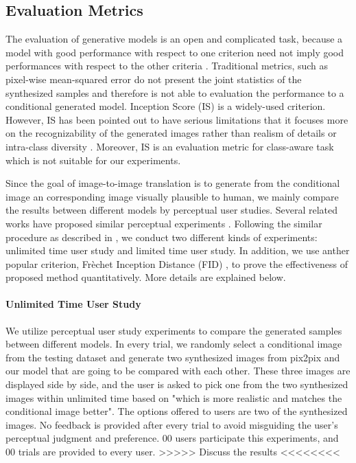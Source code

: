 \subsection{ Evaluation Metrics}
The evaluation of generative models is an open and complicated task, because a model with good performance with respect to one criterion need not imply good performances with respect to the other criteria \cite{evaluation, GANs_equal}. Traditional metrics, such as pixel-wise mean-squared error do not present the joint statistics of the synthesized samples and therefore is not able to evaluation the performance to a conditional generated model. 
Inception Score (IS) \cite{IS} is a widely-used criterion. However, IS has been pointed out to have serious limitations that it focuses more on the recognizability of the generated images rather than realism of details or intra-class diversity \cite{evaluation}. Moreover, IS is an evaluation metric for class-aware task which is not suitable for our experiments.
 
Since the goal of image-to-image translation is to generate from the conditional image an corresponding image visually plausible to human, we mainly compare the results between different models by perceptual user studies. Several related works have proposed similar perceptual experiments \cite{LaplaceGANs, SRGANs, Improved_techniques, CRN, pix2pixHD}. Following the similar procedure as described in \cite{CRN}, we conduct two different kinds of experiments: unlimited time user study and limited time user study. 
In addition, we use anther popular criterion, Frèchet Inception Distance (FID) \cite{FID}, to prove the effectiveness of proposed method quantitatively. More details are explained below.
\paragraph{Unlimited Time User Study}
We utilize perceptual user study experiments to compare the generated samples between different models. In every trial, we randomly select a conditional image from the testing dataset and generate two synthesized images from pix2pix and our model that are going to be compared with each other. These three images are displayed side by side, and the user is asked to pick one from the two synthesized images within unlimited time based on "which is more realistic and matches the conditional image better". The options offered to users are two of the synthesized images. No feedback is provided after every trial to avoid misguiding the user's perceptual judgment and preference. 00 users participate this experiments, and 00 trials are provided to every user.
>>>>> Discuss the results <<<<<<<< 
